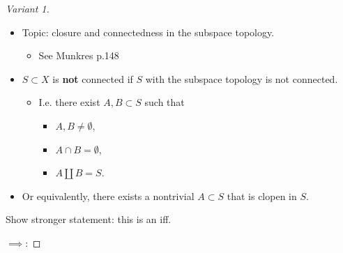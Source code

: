 \begin{solution}

\envlist

\begin{concept}

\envlist

\end{concept}

\begin{proof}[Variant 1]

\envlist

\begin{concept}

\envlist

\begin{itemize}
\tightlist
\item
  Topic: closure and connectedness in the subspace topology.

  \begin{itemize}
  \tightlist
  \item
    See Munkres p.148
  \end{itemize}
\end{itemize}

\end{concept}

\envlist

\begin{itemize}
\tightlist
\item
  \(S\subset X\) is \textbf{not } connected if \(S\) with the subspace
  topology is not connected.

  \begin{itemize}
  \tightlist
  \item
    I.e. there exist \(A, B \subset S\) such that

    \begin{itemize}
    \tightlist
    \item
      \(A, B \neq \emptyset\),
    \item
      \(A\cap B = \emptyset\),
    \item
      \(A {\coprod}B = S\).
    \end{itemize}
  \end{itemize}
\item
  Or equivalently, there exists a nontrivial \(A\subset S\) that is
  clopen in \(S\).
\end{itemize}

Show stronger statement: this is an iff.

\(\implies\):


\end{proof}
\end{solution}
